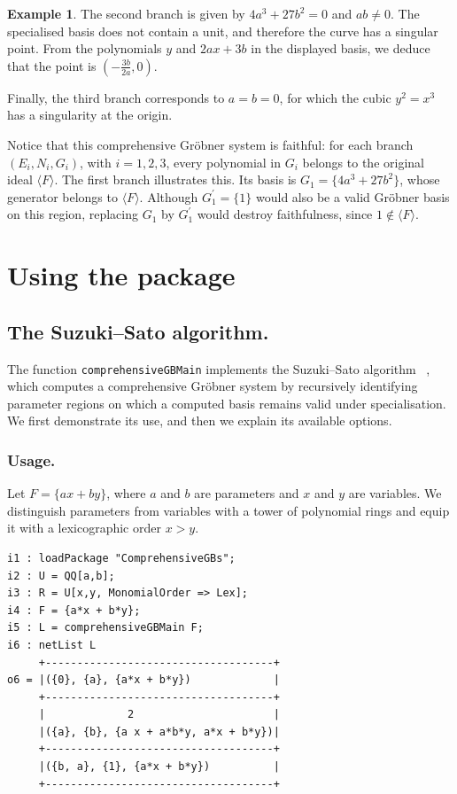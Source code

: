 \documentclass[11pt]{amsart}
\theoremstyle{plain}
\theoremstyle{definition}
\newtheorem{example}[theorem]{Example}
\theoremstyle{remark}
\begin{document}
\begin{example}
The second branch is given by $4a^3+27b^2=0$ and $ab\neq0$. The specialised basis does not contain a unit, and therefore the curve has a singular point. From the polynomials $y$ and $2ax+3b$ in the displayed basis, we deduce that the point is $(-\frac{3b}{2a}, 0)$.

Finally, the third branch corresponds to $a=b=0$, for which the cubic $y^2=x^3$ has a singularity at the origin.

Notice that this comprehensive Gr\"obner system is
faithful: for each branch $(E_i,N_i,G_i)$, with
$i=1,2,3$, every polynomial in $G_i$ belongs to the
original ideal $\langle F\rangle$.
The first branch illustrates this.
Its basis is $G_1=\{4a^3+27b^2\}$, whose generator
belongs to $\langle F\rangle$.
Although $G_1^\prime=\{1\}$ would also be a valid
Gr\"obner basis on this region,
replacing $G_1$ by $G_1^\prime$ would destroy
faithfulness, since $1\notin\langle F\rangle$.
\end{example}

\section{Using the package}\label{section:using-the-package}


\subsection{The Suzuki--Sato algorithm.}

The function \texttt{comprehensiveGBMain} implements the Suzuki--Sato algorithm ~\cite{SS}, which computes a comprehensive Gr\"obner
system by recursively identifying parameter regions on which
a computed basis remains valid under specialisation.
We first demonstrate its use, and then we explain its available options.

\subsubsection{Usage.}\label{section:usage-example}
Let $F=\{ax+by\}$, where $a$ and $b$ are parameters and $x$ and $y$ are variables.
We distinguish parameters from variables with a tower of polynomial rings and equip it with a lexicographic order $x>y$.
\begin{lstlisting}
i1 : loadPackage "ComprehensiveGBs";
i2 : U = QQ[a,b];
i3 : R = U[x,y, MonomialOrder => Lex];
i4 : F = {a*x + b*y};
i5 : L = comprehensiveGBMain F;
i6 : netList L
     +------------------------------------+
o6 = |({0}, {a}, {a*x + b*y})             |
     +------------------------------------+
     |             2                      |
     |({a}, {b}, {a x + a*b*y, a*x + b*y})|
     +------------------------------------+
     |({b, a}, {1}, {a*x + b*y})          |
     +------------------------------------+
\end{lstlisting}
\end{document}
